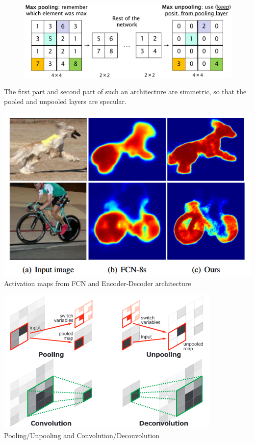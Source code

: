 \begin{figure}[h]
    \centering
    \includegraphics[scale=0.5]{img/Unpooling.png}
\end{figure}
The first part and second part of such an architecture are simmetric, so that the pooled and unpooled layers are specular. 

\begin{multicols}{2}
    \begin{center}
        \includegraphics[scale=0.5]{img/FCNvsED.png}
        Activation maps from FCN and Encoder-Decoder architecture
    \end{center}
    \begin{center}
        \includegraphics[scale=0.8]{img/Unpool_Deconv.png}
        Pooling/Unpooling and Convolution/Deconvolution
    \end{center}
\end{multicols}

